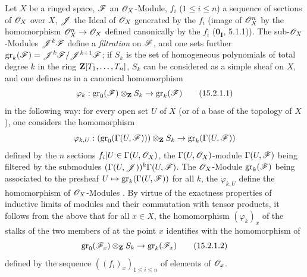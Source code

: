 \begin{env}[15.2.1]
\label{0.15.2.1}
Let $X$ be a ringed space, $\mathscr{F}$ an $\mathscr{O}_X$-Module, $f_i$ ($1\leq i\leq n$) a sequence of sections of $\mathscr{O}_X$ over $X$, $\mathscr{J}$ the Ideal of $\mathscr{O}_X$ generated by the $f_i$ (image of $\mathscr{O}_X^n$ by the homomorphism $\mathscr{O}_X^n\to\mathscr{O}_X$ defined canonically by the $f_i$ ($\mathbf{0_I}$, 5.1.1)).
The sub-$\mathscr{O}_X$-Modules $\mathscr{J}^k\mathscr{F}$ define a \emph{filtration} on $\mathscr{F}$, and one sets further $\operatorname{gr}_k(\mathscr{F})=\mathscr{J}^k\mathscr{F}/\mathscr{J}^{k+1}\mathscr{F}$;
if $S_k$ is the set of homogeneous polynomials of total degree $k$ in the ring $\mathbf{Z}[T_1,\ldots,T_n]$, $S_k$ can be considered as a simple sheaf on $X$, and one defines as in  a canonical homomorphism
\[
\label{0.15.2.1.1}
  \varphi_k : \operatorname{gr}_0(\mathscr{F})\otimes_{\mathbf{Z}} S_k \to \operatorname{gr}_k(\mathscr{F})
\tag{15.2.1.1}
\]
in the following way:
for every open set $U$ of $X$ (or of a base of the topology of $X$), one considers the homomorphism 
\[
  \varphi_{k,U} : (\operatorname{gr}_0(\Gamma(U,\mathscr{F})))\otimes_{\mathbf{Z}}S_k \to \operatorname{gr}_k(\Gamma(U,\mathscr{F}))
\]
defined by the $n$ sections $f_i|U\in\Gamma(U,\mathscr{O}_X)$, the $\Gamma(U,\mathscr{O}_X)$-module $\Gamma(U,\mathscr{F})$ being filtered by the submodules $(\Gamma(U,\mathscr{J}))^k\Gamma(U,\mathscr{F})$.
The $\mathscr{O}_X$-Module $\operatorname{gr}_k(\mathscr{F})$ being associated to the presheaf $U\mapsto\operatorname{gr}_k(\Gamma(U,\mathscr{F}))$ for all $k$, the $\varphi_{k,U}$ define the homomorphism of $\mathscr{O}_X$-Modules .
By virtue of the exactness properties of inductive limits of modules and their commutation with tensor products, it follows from the above that for all $x\in X$, the homomorphism $(\varphi_k)_x$ of the stalks of the two members of  at the point $x$ identifies with the homomorphism of 
\[
\label{0.15.2.1.2}
  \operatorname{gr}_0(\mathscr{F}_x)\otimes_{\mathbf{Z}}S_k \to \operatorname{gr}_k(\mathscr{F}_x)
\tag{15.2.1.2}
\]
defined by the sequence $((f_i)_x)_{1\leq i\leq n}$ of elements of $\mathscr{O}_x$.
\end{env}

